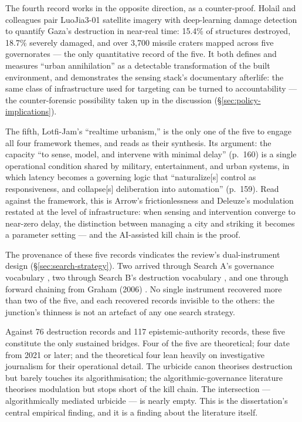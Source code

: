 The fourth record works in the opposite direction, as a counter-proof. Holail and colleagues \citeyearpar[p.~2]{holail2024} pair LuoJia3-01 satellite imagery with deep-learning damage detection to quantify Gaza's destruction in near-real time: 15.4\% of structures destroyed, 18.7\% severely damaged, and over 3,700 missile craters mapped across five governorates — the only quantitative record of the five. It both defines and measures ``urban annihilation'' as a detectable transformation of the built environment, and demonstrates the sensing stack's documentary afterlife: the same class of infrastructure used for targeting can be turned to accountability — the counter-forensic possibility taken up in the discussion (\S\ref{sec:policy-implications}).

The fifth, Lotfi-Jam's \citeyearpar{lotfijam2025} ``realtime urbanism,'' is the only one of the five to engage all four framework themes, and reads as their synthesis. Its argument: the capacity ``to sense, model, and intervene with minimal delay'' (p.~160) is a single operational condition shared by military, entertainment, and urban systems, in which latency becomes a governing logic that ``naturalize[s] control as responsiveness, and collapse[s] deliberation into automation'' (p.~159). Read against the framework, this is Arrow's frictionlessness and Deleuze's modulation restated at the level of infrastructure: when sensing and intervention converge to near-zero delay, the distinction between managing a city and striking it becomes a parameter setting — and the AI-assisted kill chain is the proof.

The provenance of these five records vindicates the review's dual-instrument design (\S\ref{sec:search-strategy}). Two arrived through Search A's governance vocabulary \parencite{zavrsnik2021,lotfijam2025}, two through Search B's destruction vocabulary \parencite{graham2008,holail2024}, and one through forward chaining from Graham (2006) \parencite{hourani2024}. No single instrument recovered more than two of the five, and each recovered records invisible to the others: the junction's thinness is not an artefact of any one search strategy.

Against 76 destruction records and 117 epistemic-authority records, these five constitute the only sustained bridges. Four of the five are theoretical; four date from 2021 or later; and the theoretical four lean heavily on investigative journalism for their operational detail. The urbicide canon theorises destruction but barely touches its algorithmisation; the algorithmic-governance literature theorises modulation but stops short of the kill chain. The intersection — algorithmically mediated urbicide — is nearly empty. This is the dissertation's central empirical finding, and it is a finding about the literature itself.


